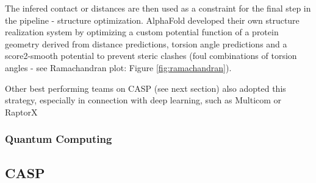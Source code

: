 The infered contact or distances  are then used as a constraint for the final step in the pipeline - structure optimization. AlphaFold developed their own structure realization system by optimizing a custom potential function of a protein geometry derived from distance predictions, torsion angle predictions and a score2-smooth potential to prevent steric clashes (foul combinations of torsion angles - see Ramachandran plot: Figure \ref{fig:ramachandran}).

Other best performing teams on CASP (see next section) also adopted this strategy, especially in connection with deep learning, such as Multicom \cite{multicom} or RaptorX \cite{raptorx}

\subsubsection{Quantum Computing}

\subsection{CASP}

